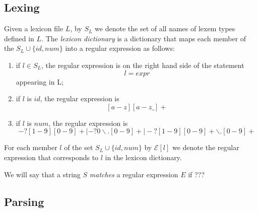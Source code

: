 \documentclass[a4paper,10pt]{article}
\begin{document}
\subsection{Lexing}\label{lex}
Given a lexicon file $L$, by $S_L$ we denote the set of all names of lexem types defined in $L$. 
The \textit{lexicon dictionary} is a dictionary that maps each member of the  $S_L \cup \{id,num\}$ into a regular expression as follows:
\begin{enumerate}
\item if $l \in S_L$, the regular expression is on the right hand side of the statement
$$l = expr$$
appearing in L;
\item if $l$ is $id$, the regular expression is 
                               $$[a-z][a-z\_]+$$
\item if $l$ is $num$, the regular expression is 
                $$-?[1-9][0-9]+ |-?0\backslash.[0-9]+ | -?[1-9][0-9]+\backslash.[0-9]+$$ 

\end{enumerate}

For each member $l$ of the set $S_L \cup \{id,num\}$ by $\mathcal{E}[l]$ we denote the regular expression that corresponds to $l$ in  the lexicon dictionary.

We will say that a string $S$ \textit{matches} a regular expression $E$ if ??? 

  
\subsection{Parsing}\label{pars}


\end{document}

